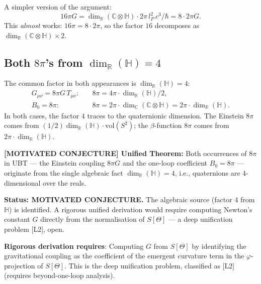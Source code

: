 \documentclass[12pt,a4paper]{article}
\theoremstyle{definition}
\theoremstyle{remark}
\begin{document}
A simpler version of the argument:
\begin{equation}
  16\pi G = \dim_{\mathbb{R}}(\mathbb{C}\otimes\mathbb{H}) \cdot 2\pi\,l_P^2\,c^3/\hbar
  = 8 \cdot 2\pi G.
  \label{eq:16piG_simple}
\end{equation}
This \emph{almost} works: $16\pi = 8 \cdot 2\pi$, so the factor $16$ decomposes as
$\dim_{\mathbb{R}}(\mathbb{C}\otimes\mathbb{H}) \times 2$.

\subsection{Both $8\pi$'s from $\dim_{\mathbb{R}}(\mathbb{H}) = 4$}

The common factor in both appearances is $\dim_{\mathbb{R}}(\mathbb{H}) = 4$:
\begin{align}
  G_{\mu\nu} = 8\pi G\,T_{\mu\nu}:&
    \quad 8\pi = 4\pi \cdot \dim_{\mathbb{R}}(\mathbb{H})/2, \\
  B_0 = 8\pi:&
    \quad 8\pi = 2\pi \cdot \dim_{\mathbb{C}}(\mathbb{C}\otimes\mathbb{H})
              = 2\pi \cdot \dim_{\mathbb{R}}(\mathbb{H}).
\end{align}
In both cases, the factor $4$ traces to the quaternionic dimension.
The Einstein $8\pi$ comes from $(1/2)\dim_{\mathbb{R}}(\mathbb{H})\cdot\mathrm{vol}(S^2)$;
the $\beta$-function $8\pi$ comes from $2\pi\cdot\dim_{\mathbb{R}}(\mathbb{H})$.

\begin{insightbox}
\textbf{[MOTIVATED CONJECTURE] Unified Theorem:}
Both occurrences of $8\pi$ in UBT --- the Einstein coupling $8\pi G$ and the
one-loop coefficient $B_0 = 8\pi$ --- originate from the single algebraic fact
$\dim_{\mathbb{R}}(\mathbb{H}) = 4$, i.e., quaternions are 4-dimensional over
the reals.

\medskip
\noindent\textbf{Status: MOTIVATED CONJECTURE.}
The algebraic source (factor 4 from $\mathbb{H}$) is identified.
A rigorous unified derivation would require computing Newton's constant $G$ directly
from the normalisation of $S[\Theta]$ --- a deep unification problem [L2], open.

\medskip
\noindent\textbf{Rigorous derivation requires}: Computing $G$ from $S[\Theta]$
by identifying the gravitational coupling as the coefficient of the emergent
curvature term in the $\varphi$-projection of $S[\Theta]$.  This is the deep
unification problem, classified as [L2] (requires beyond-one-loop analysis).
\end{insightbox}
\end{document}
